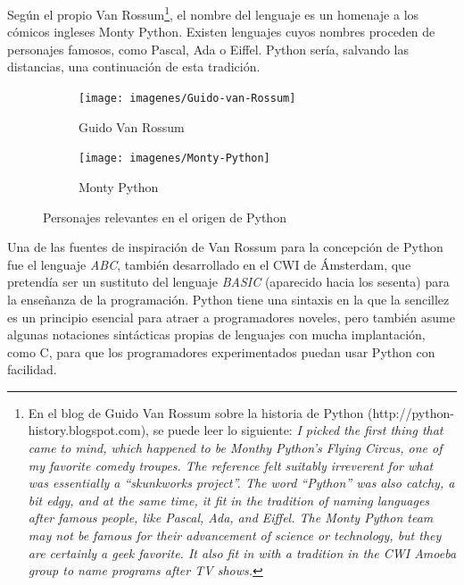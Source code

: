 Según el propio Van Rossum\footnote{En el blog de Guido Van Rossum sobre la historia de Python (http://python-history.blogspot.com), se puede leer lo siguiente: \emph{I picked the first thing that came to mind, which happened to be Monthy Python’s Flying Circus, one of my favorite comedy troupes. The reference felt suitably irreverent for what was essentially a “skunkworks project”. The word “Python” was also catchy, a bit edgy, and at the same time, it fit in the tradition of naming languages after famous people, like Pascal, Ada, and Eiffel. The Monty Python team may not be famous for their advancement of science or technology, but they are certainly a geek favorite. It also fit in with a tradition in the CWI Amoeba group to name programs after TV shows.}}, el nombre del lenguaje es un homenaje a los cómicos ingleses Monty Python. Existen lenguajes cuyos nombres proceden de personajes famosos, como Pascal, Ada o Eiffel. Python sería, salvando las distancias, una continuación de esta tradición. 

\begin{figure}
\captionsetup[subfigure]{labelformat=empty}
\begin{subfigure}{0.48\textwidth}
\texttt{[image: imagenes/Guido-van-Rossum]}
\caption{Guido Van Rossum} \label{fig:guido-van-rossum}
\end{subfigure}
\hspace*{\fill} 
\begin{subfigure}{0.48\textwidth}
\texttt{[image: imagenes/Monty-Python]}
\caption{Monty Python} \label{fig:monty-python}
\end{subfigure}
\caption{Personajes relevantes en el origen de Python}
\end{figure}

Una de las fuentes de inspiración de Van Rossum para la concepción de Python fue el lenguaje \emph{ABC}, también desarrollado en el CWI de Ámsterdam, que pretendía ser un sustituto del lenguaje \emph{BASIC} (aparecido hacia los sesenta) para la enseñanza de la programación. Python tiene una sintaxis en la que la sencillez es un principio esencial para atraer a programadores noveles, pero también asume algunas notaciones sintácticas propias de lenguajes con mucha implantación, como C, para que los programadores experimentados puedan usar Python con facilidad.

